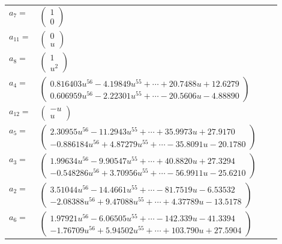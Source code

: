 \documentclass[1p]{elsarticle_modified}
\theoremstyle{definition}
\begin{document}
\begin{tabular}{m{7pt} m{180pt} m{7pt} m{180pt} }
\flushright $a_{7}=$&$\begin{pmatrix}1\\0\end{pmatrix}$ \\
\flushright $a_{11}=$&$\begin{pmatrix}0\\u\end{pmatrix}$ \\
\flushright $a_{8}=$&$\begin{pmatrix}1\\u^2\end{pmatrix}$ \\
\flushright $a_{4}=$&$\begin{pmatrix}0.816403 u^{56}-4.19849 u^{55}+\cdots+20.7488 u+12.6279\\0.606959 u^{56}-2.22301 u^{55}+\cdots-20.5606 u-4.88890\end{pmatrix}$ \\
\flushright $a_{12}=$&$\begin{pmatrix}- u\\u\end{pmatrix}$ \\
\flushright $a_{5}=$&$\begin{pmatrix}2.30955 u^{56}-11.2943 u^{55}+\cdots+35.9973 u+27.9170\\-0.886184 u^{56}+4.87279 u^{55}+\cdots-35.8091 u-20.1780\end{pmatrix}$ \\
\flushright $a_{3}=$&$\begin{pmatrix}1.99634 u^{56}-9.90547 u^{55}+\cdots+40.8820 u+27.3294\\-0.548286 u^{56}+3.70956 u^{55}+\cdots-56.9911 u-25.6210\end{pmatrix}$ \\
\flushright $a_{2}=$&$\begin{pmatrix}3.51044 u^{56}-14.4661 u^{55}+\cdots-81.7519 u-6.53532\\-2.08388 u^{56}+9.47088 u^{55}+\cdots+4.37789 u-13.5178\end{pmatrix}$ \\
\flushright $a_{6}=$&$\begin{pmatrix}1.97921 u^{56}-6.06505 u^{55}+\cdots-142.339 u-41.3394\\-1.76709 u^{56}+5.94502 u^{55}+\cdots+103.790 u+27.5904\end{pmatrix}$ \\

\end{tabular}
\end{document}
